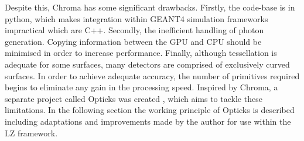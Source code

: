 \par
Despite this, Chroma has some significant drawbacks.
Firstly, the code-base is in python, which makes integration within GEANT4 simulation frameworks impractical which are C++.
Secondly, the inefficient handling of photon generation.
Copying information between the GPU and CPU should be minimised in order to increase performance.
Finally, although tessellation is adequate for some surfaces, many detectors are comprised of exclusively curved surfaces.
In order to achieve adequate accuracy, the number of primitives required begins to eliminate any gain in the processing speed.
Inspired by Chroma, a separate project called Opticks was created \cite{Opticks_Paper_2017_ref,Opticks_CHEP_2019_ref,Opticks_CHEP_2021_ref}, which aims to tackle these limitations.
In the following section the working principle of Opticks is described including adaptations and improvements made by the author for use within the LZ framework.

